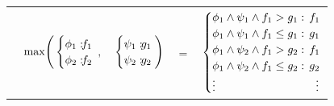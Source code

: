 \documentclass{article} %
\begin{document}
{\footnotesize
\begin{center}
\begin{tabular}{r c c c l}
&
\hspace{-7mm} $\mathrm{max} \Bigg(
  \begin{cases}
    \phi_1: \hspace{-2mm} & \hspace{-2mm} f_1 \\ 
    \phi_2: \hspace{-2mm} & \hspace{-2mm} f_2 \\ 
  \end{cases}$
$,$
&
\hspace{-4mm}
  $\begin{cases}
    \psi_1: \hspace{-2mm} & \hspace{-2mm} g_1 \\ 
    \psi_2: \hspace{-2mm} & \hspace{-2mm} g_2 \\ 
  \end{cases} \Bigg)$
&
\hspace{-4mm} 
$ = $
&
\hspace{-4mm}
  $\begin{cases}
  \phi_1 \wedge \psi_1 \wedge f_1 > g_1    : & \hspace{-2mm} f_1 \\ 
  \phi_1 \wedge \psi_1 \wedge f_1 \leq g_1 : & \hspace{-2mm} g_1 \\ 
  \phi_1 \wedge \psi_2 \wedge f_1 > g_2    : & \hspace{-2mm}f_1 \\ 
  \phi_1 \wedge \psi_2 \wedge f_1 \leq g_2 : & \hspace{-2mm} g_2 \\ 
  \vdots & \vdots
  \end{cases}$
\end{tabular}
\end{center}
}
\end{document}
